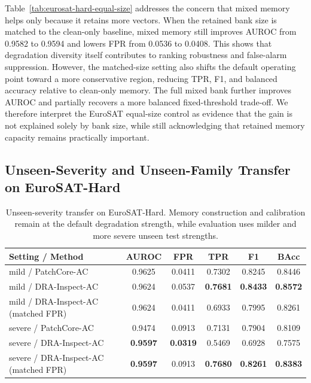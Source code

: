 \documentclass[remotesensing,article,submit,pdftex,moreauthors]{Definitions/mdpi}
\begin{document}
\noindent Table~\ref{tab:eurosat-hard-equal-size} addresses the concern that mixed memory helps only because it retains more vectors. When the retained bank size is matched to the clean-only baseline, mixed memory still improves AUROC from 0.9582 to 0.9594 and lowers FPR from 0.0536 to 0.0408. This shows that degradation diversity itself contributes to ranking robustness and false-alarm suppression. However, the matched-size setting also shifts the default operating point toward a more conservative region, reducing TPR, F1, and balanced accuracy relative to clean-only memory. The full mixed bank further improves AUROC and partially recovers a more balanced fixed-threshold trade-off. We therefore interpret the EuroSAT equal-size control as evidence that the gain is not explained solely by bank size, while still acknowledging that retained memory capacity remains practically important.

\subsection{Unseen-Severity and Unseen-Family Transfer on EuroSAT-Hard}

\begin{table}[!htbp]
\caption{Unseen-severity transfer on EuroSAT-Hard. Memory construction and calibration remain at the default degradation strength, while evaluation uses milder and more severe unseen test strengths.}
\label{tab:eurosat-hard-unseen-severity}
\centering
\small
\setlength{\tabcolsep}{4pt}
\begin{tabular}{lccccc}
\hline
Setting / Method & AUROC & FPR & TPR & F1 & BAcc \\
\hline
mild / PatchCore-AC & 0.9625 & 0.0411 & 0.7302 & 0.8245 & 0.8446 \\
mild / DRA-Inspect-AC & 0.9624 & 0.0537 & \textbf{0.7681} & \textbf{0.8433} & \textbf{0.8572} \\
mild / DRA-Inspect-AC (matched FPR) & 0.9624 & 0.0411 & 0.6933 & 0.7995 & 0.8261 \\
severe / PatchCore-AC & 0.9474 & 0.0913 & 0.7131 & 0.7904 & 0.8109 \\
severe / DRA-Inspect-AC & \textbf{0.9597} & \textbf{0.0319} & 0.5469 & 0.6928 & 0.7575 \\
severe / DRA-Inspect-AC (matched FPR) & \textbf{0.9597} & 0.0913 & \textbf{0.7680} & \textbf{0.8261} & \textbf{0.8383} \\
\hline
\end{tabular}
\end{table}
\end{document}
